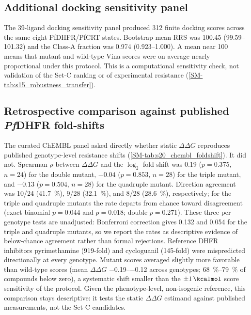 \documentclass[journal=jcisd8,manuscript=article,layout=traditional]{achemso}
\begin{document}
\subsection{Additional docking sensitivity panel}

The 39-ligand docking sensitivity panel produced \num{312} finite docking scores across the same eight PfDHFR/PfCRT states. Bootstrap mean RRS was \num{100.45} (\numrange{99.59}{101.32}) and the Class-A fraction was \num{0.974} (\numrange{0.923}{1.000}). A mean near \num{100} means that mutant and wild-type Vina scores were on average nearly proportional under this protocol. This is a computational sensitivity check, not validation of the Set-C ranking or of experimental resistance (\cref{SM-tab:s15_robustness_transfer}).

\subsection{Retrospective comparison against published \textit{Pf}DHFR fold-shifts}

The curated ChEMBL panel asked directly whether static $\Delta\Delta G$ reproduces published genotype-level resistance shifts (\cref{SM-tab:s20_chembl_foldshift}). It did not. Spearman $\rho$ between $\Delta\Delta G$ and the $\log_2$ fold-shift was \num{0.19} ($p=\num{0.375}$, $n=\num{24}$) for the double mutant, $-\num{0.04}$ ($p=\num{0.853}$, $n=\num{28}$) for the triple mutant, and $-\num{0.13}$ ($p=\num{0.504}$, $n=\num{28}$) for the quadruple mutant. Direction agreement was \num{10}/\num{24} (\qty{41.7}{\percent}), \num{9}/\num{28} (\qty{32.1}{\percent}), and \num{8}/\num{28} (\qty{28.6}{\percent}), respectively; for the triple and quadruple mutants the rate departs from chance toward disagreement (exact binomial $p=\num{0.044}$ and $p=\num{0.018}$; double $p=\num{0.271}$). These three per-genotype tests are unadjusted: Bonferroni correction gives \num{0.132} and \num{0.054} for the triple and quadruple mutants, so we report the rates as descriptive evidence of below-chance agreement rather than formal rejections. Reference DHFR inhibitors pyrimethamine (\num{919}-fold) and cycloguanil (\num{145}-fold) were mispredicted directionally at every genotype. Mutant scores averaged slightly more favorable than wild-type scores (mean $\Delta\Delta G$ \qtyrange{-0.19}{-0.12}{\kcalmol} across genotypes; \qtyrange{68}{79}{\percent} of compounds below zero), a systematic shift smaller than the $\pm\qty{1}{\kcalmol}$ score sensitivity of the protocol. Given the phenotype-level, non-isogenic reference, this comparison stays descriptive: it tests the static $\Delta\Delta G$ estimand against published measurements, not the Set-C candidates.
\end{document}
